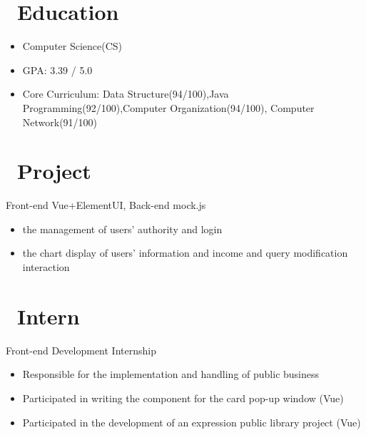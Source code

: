 \documentclass{resume}
\begin{document}


\section{\faGraduationCap\ Education}
\begin{itemize}
  \item Computer Science(CS)
  \item GPA: 3.39 / 5.0
  \item Core Curriculum: Data Structure(94/100),Java Programming(92/100),Computer Organization(94/100),
        Computer Network(91/100)
\end{itemize}


\section{\faUsers\ Project}
Front-end Vue+ElementUI, Back-end mock.js
\begin{itemize}
  \item the management of users' authority and login
  \item the chart display of users' information and income and query modification interaction
\end{itemize}

\section{\faUsers\ Intern}
Front-end Development Internship
\begin{itemize}
  \item Responsible for the implementation and handling of public business
  \item Participated in writing the component for the card pop-up window (Vue)
  \item Participated in the development of an expression public library project (Vue)
\end{itemize}

\end{document}
